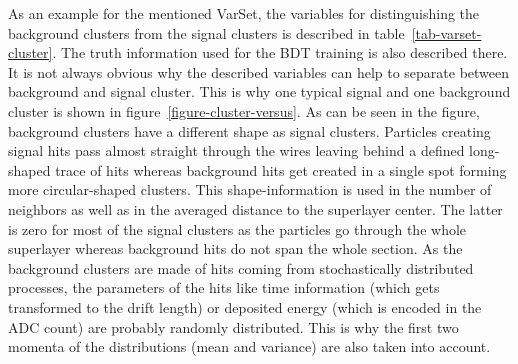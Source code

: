 As an example for the mentioned VarSet, the variables for distinguishing the background clusters from the signal clusters is described in table~\ref{tab-varset-cluster}. The truth information used for the BDT training is also described there. It is not always obvious why the described variables can help to separate between background and signal cluster. This is why one typical signal and one background cluster is shown in figure~\ref{figure-cluster-versus}. As can be seen in the figure, background clusters have a different shape as signal clusters. Particles creating signal hits pass almost straight through the wires leaving behind a defined long-shaped trace of hits whereas background hits get created in a single spot forming more circular-shaped clusters. This shape-information is used in the number of neighbors as well as in the averaged distance to the superlayer center. The latter is zero for most of the signal clusters as the particles go through the whole superlayer whereas background hits do not span the whole section. As the background clusters are made of hits coming from stochastically distributed processes, the parameters of the hits like time information (which gets transformed to the drift length) or deposited energy (which is encoded in the ADC count) are probably randomly distributed. This is why the first two momenta of the distributions (mean and variance) are also taken into account.

\begin{figure}
  \caption{}
  \label{fig-cluster-versus}
\end{figure}


